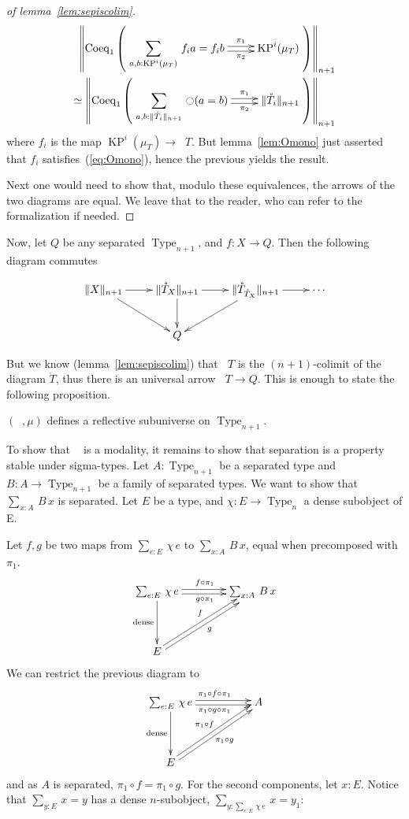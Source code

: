\documentclass[notfinal]{jfrarticle}
\DeclareMathOperator{\Type}{Type}
\newcommand{\modal}{\ensuremath{\ocircle}}
\newcommand \separated {\mathop{\square_{n+1}} }
\newcommand{\sumD}[3]{\sum_{#1:#2}\, #3}
\newcommand{\code}[1]{\texttt{#1}}
\DeclareMathOperator{\KP}{KP}
\begin{document}
\begin{proof}[of lemma~\ref{lem:sepiscolim}]
  \[
    \begin{split}
    \left\|\mathrm{Coeq}_1 \left( 
      \xymatrix{
        \displaystyle{\sumD {a,b}{\KP^i(\mu_T)} {f_{i} a = f_{i} b}} \ar@<-.5ex>[r]_-{\pi_2} \ar@<.5ex>[r]^-{\pi_1} & \KP^i(\mu_T)
      }
    \right)\right\|_{n+1}
    \\ \simeq 
    \left\|\mathrm{Coeq}_1 \left( 
      \xymatrix{\displaystyle{\sumD {a,b} {\|\mathring T_i\|_{n+1}} {\modal (a=b)}} \ar@<-.5ex>[r]_-{\pi_2} \ar@<.5ex>[r]^-{\pi_1} & \|\mathring T_i\|_{n+1}}
    \right)\right\|_{n+1}
    \end{split}
  \]
  where $f_{i}$ is the map $\KP^i(\mu_T) \to \separated T$. But
  lemma~\ref{lem:Omono} just asserted that $f_i$
  satisfies~(\ref{eq:Omono}), hence the previous yields the result.
  
  Next one would need to show that, modulo these equivalences, the arrows
  of the two diagrams are equal. We leave that to the reader, who can
  refer to the formalization if needed.
\end{proof}

Now, let $Q$ be any separated $\Type_{n+1}$, and $f:X \to Q$. Then the
following diagram commutes

\[\xymatrix{
\|X\|_{n+1} \ar[r] \ar[rd] & \|\mathring T_{X}\|_{n+1} \ar[r] \ar[d] & \|\mathring
  T_{\mathring T_X} \|_{n+1} \ar[ld] \ar[r] & \cdots \\
  & Q &&
} \]%

But we know (lemma~\ref{lem:sepiscolim}) that $\separated T$ is the
$(n+1)$-colimit of the diagram $\mathring T$, thus there is an universal
arrow $\separated T \to Q$.
%
This is enough to state the following proposition.
\begin{prop}[\thethm\ (\code{separation\_reflective\_subuniverse})]
\label{prop:sep-subu}
  $(\separated,\mu)$ defines a reflective subuniverse on $\Type_{n+1}$.
\end{prop}

To show that $\separated$ is a modality, it remains to show that
separation is a property stable under sigma-types.
%
Let $A:\Type_{n+1}$ be a separated type and $B:A \to \Type_{n+1}$ be a
family of separated types. We want to show that $\sumD x A {B\, x}$ is separated. Let $E$
be a type, and $\chi:E\to\Type_n$ a dense subobject of E.

Let $f,g$ be two maps from $\sumD e E {\chi\,e}$ to $\sumD x A
{B\, x}$, equal when precomposed with $\pi_1$.
\[\xymatrix @R=4em @C=4em{
  \sumD e E {\chi\, e} \ar@<-2pt>[r]_{g\circ\pi_1}
  \ar@<2pt>[r]^{f\circ \pi_1} \ar[d]_{\mathrm{dense}}& \sumD x A {B\, x} \\
  E \ar@<-2pt>[ru]_{g} \ar@<2pt>[ru]^{f}&
}\]%
We can restrict the previous diagram to 
\[\xymatrix @R=4em @C=5em{
  \sumD e E {\chi\, e} \ar@<-2pt>[r]_{\pi_1\circ g\circ\pi_1} \ar@<2pt>[r]^{\pi_1\circ f\circ \pi_1} \ar[d]_{\mathrm{dense}}& A \\
  E \ar@<-2pt>[ru]_{\pi_1\circ g} \ar@<2pt>[ru]^{\pi_1\circ f}&
}\]%
and as $A$ is separated, $\pi_1\circ f = \pi_1 \circ g$.
For the second components, let $x:E$. Notice that 
$\sumD y E {x = y}$ has a dense $n$-subobject, $\sumD y {\sumD e E {\chi\,
  e}} {x=y_1}$:
\end{document}
